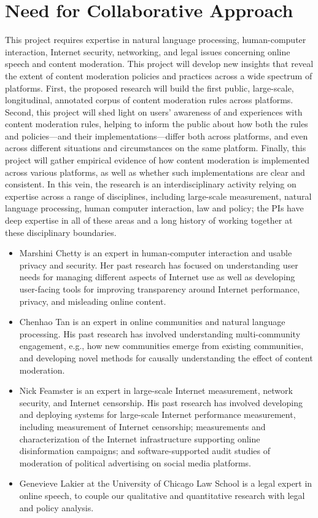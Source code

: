 \section{Need for Collaborative Approach}
\label{sec:collaboration}

This project requires expertise in natural language processing, human-computer
interaction, Internet security, networking, and legal issues concerning online
speech and content moderation.  This project will develop new insights that
reveal the extent of content moderation policies and practices across a wide
spectrum of platforms.  First, the proposed research will build the first
public, large-scale, longitudinal, annotated corpus of content moderation
rules across platforms.  Second, this project will shed light on users'
awareness of and experiences with content moderation rules, helping to inform
the public about how both the rules and policies---and their
implementations---differ both across platforms, and even across different
situations and circumstances on the same platform.  Finally, this project will
gather empirical evidence of how content moderation is implemented across
various platforms, as well as whether such implementations are clear and
consistent. In this vein, the research is an interdisciplinary activity
relying on expertise across a range of disciplines, including large-scale
measurement, natural language processing, human computer interaction, law and
policy; the PIs have deep expertise in all of these areas and a long history
of working together at these disciplinary boundaries.

\begin{itemize}
    \itemsep=-1pt
    \item Marshini Chetty is an expert in human-computer interaction and usable privacy and
security. Her past research has focused on understanding user needs for
managing different aspects of Internet use as well as developing user-facing
tools for improving transparency around Internet performance, privacy, and
misleading online content. 
\item Chenhao Tan is an expert in online communities and
natural language processing.  His past research has involved understanding
multi-community engagement, e.g., how new communities emerge from existing
communities, and developing novel methods for causally understanding the
effect of content moderation.  
\item Nick Feamster is an expert in large-scale
Internet measurement, network security, and Internet censorship. His past
research has involved developing and deploying systems for large-scale
Internet performance measurement, including measurement of Internet
censorship; measurements and characterization of the Internet infrastructure
supporting online disinformation campaigns; and software-supported audit
studies of moderation of political advertising on social media platforms. 
\item Genevieve Lakier at the
University of Chicago Law School is a legal expert in online speech, to
couple our qualitative and quantitative research with legal and policy
analysis.
\end{itemize}


